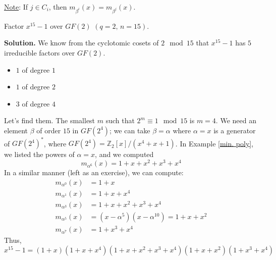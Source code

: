 \underline{Note}: If $ j\in C_i $, then $ m_{\beta^i}(x)=m_{\beta^j}(x) $.

\begin{exbox}
    \begin{example}
        Factor $ x^{15}-1 $ over $ GF(2) $ $ (q=2,\,n=15) $.

        \textbf{Solution.} We know from the cyclotomic cosets
        of $ 2\mod 15 $ that $ x^{15}-1 $ has $ 5 $ irreducible
        factors over $ GF(2) $.
        \begin{itemize}
            \item $ 1 $ of degree $ 1 $
            \item $ 1 $ of degree $ 2 $
            \item $ 3 $ of degree $ 4 $
        \end{itemize}
        Let's find them. The smallest $ m $ such that
        $ 2^m\equiv 1\mod 15 $ is $ m=4 $. We need an element
        $ \beta $ of order $ 15 $ in $ GF(2^4) $; we can
        take $ \beta=\alpha $ where $ \alpha=x $
        is a generator of $ GF(2^4)^* $, where
        $ GF(2^4)=\mathbb{Z}_2[x]/(x^4+x+1) $. In Example
        \ref{min. poly}, we listed
        the powers of $ \alpha=x $, and we computed
        \[ m_{\alpha^6}(x)=1+x+x^2+x^3+x^4 \]
        In a similar manner (left as an exercise), we can compute:
        \begin{align*}
            m_{\alpha^0}(x) & =1+x                                 \\
            m_{\alpha^1}(x) & =1+x+x^4                             \\
            m_{\alpha^3}(x) & =1+x+x^2+x^3+x^4                     \\
            m_{\alpha^5}(x) & =(x-\alpha^5)(x-\alpha^{10})=1+x+x^2 \\
            m_{\alpha^7}(x) & =1+x^3+x^4
        \end{align*}
        Thus,
        \[ x^{15}-1=(1+x)(1+x+x^4)(1+x+x^2+x^3+x^4)(1+x+x^2)(1+x^3+x^4) \]
    \end{example}
\end{exbox}

